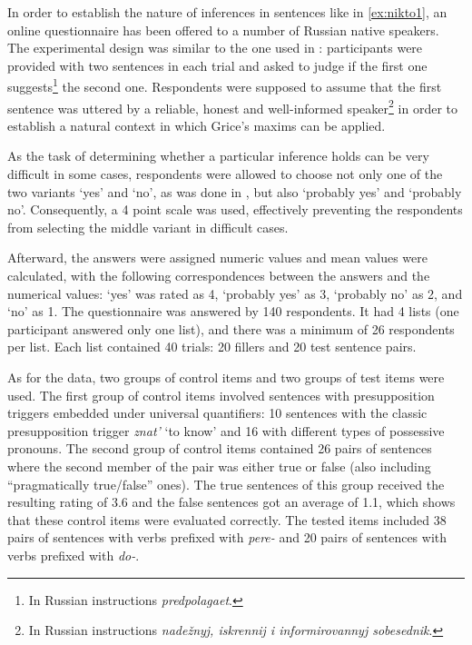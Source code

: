 In order to establish the nature of inferences in sentences like in \ref{ex:nikto1}, an online questionnaire has been offered to a number of Russian native speakers. The experimental design was similar to the one used in \citealt{Chemla:09}: participants were provided with two sentences in each trial and asked to judge if the first one suggests\footnote{In Russian instructions \textit{predpolagaet}.} the second one. Respondents were supposed to assume that the first sentence was uttered by a reliable, honest and well-informed speaker\footnote{In Russian instructions \textit{nade\v{z}nyj, iskrennij i informirovannyj sobesednik}.} in order to establish a natural context in which Grice's maxims can be applied.

As the task of determining whether a particular inference holds can be very difficult in some cases, respondents were allowed to choose not only one of the two variants `yes' and `no', as was done in \citealt{Chemla:09}, but also `probably yes' and `probably no'. Consequently, a 4 point scale was used, effectively preventing the respondents from selecting the middle variant in difficult cases.

Afterward, the answers were assigned numeric values and mean values were calculated, with the following correspondences between the answers and the numerical values: `yes' was rated as 4, `probably yes' as 3, `probably no' as 2, and `no' as 1. The questionnaire was answered by 140 respondents. It had 4 lists (one participant answered only one list), and there was a minimum of 26 respondents per list. Each list contained 40 trials: 20 fillers and 20 test sentence pairs.

As for the data, two groups of control items and two groups of test items were used. The first group of control items involved sentences with presupposition triggers embedded under universal quantifiers: 10 sentences with the classic presupposition trigger \textit{znat'} `to know' and 16 with different types of possessive pronouns. The second group of control items contained 26 pairs of sentences where the second member of the pair was either true or false (also including ``pragmatically true/false'' ones). The true sentences of this group received the resulting rating of 3.6 and the false sentences got an average of 1.1, which shows that these control items were evaluated correctly. The tested items included 38 pairs of sentences with verbs prefixed with \textit{pere-} and 20 pairs of sentences with verbs prefixed with \textit{do-}.

